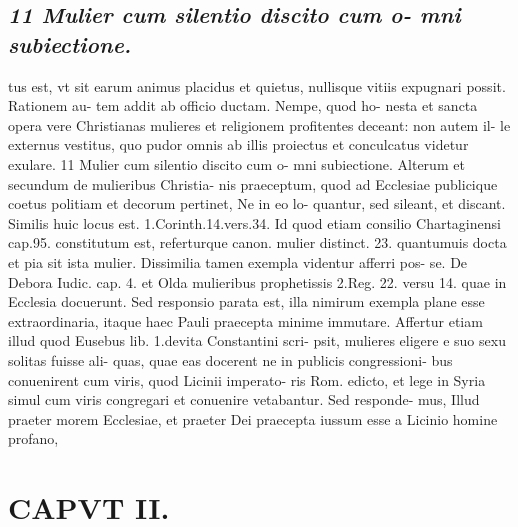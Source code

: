 \documentclass{article}
\begin{document}
\begin{pages}
\subsection*{\textit{11 Mulier cum silentio discito cum o- mni subiectione.}}tus est, vt sit earum animus placidus et quietus, nullisque vitiis expugnari possit. Rationem au- tem addit ab officio ductam. Nempe, quod ho- nesta et sancta opera vere Christianas mulieres et religionem profitentes deceant: non autem il- le externus vestitus, quo pudor omnis ab illis proiectus et conculcatus videtur exulare. 11 Mulier cum silentio discito cum o- mni subiectione. Alterum et secundum de mulieribus Christia- nis praeceptum, quod ad Ecclesiae publicique coetus politiam et decorum pertinet, Ne in eo lo- quantur, sed sileant, et discant. Similis huic locus est. 1.Corinth.14.vers.34. Id quod etiam consilio Chartaginensi cap.95. constitutum est, referturque canon. mulier distinct. 23. quantumuis docta et pia sit ista mulier. Dissimilia tamen exempla videntur afferri pos- se. De Debora Iudic. cap. 4. et Olda mulieribus prophetissis 2.Reg. 22. versu 14. quae in Ecclesia docuerunt. Sed responsio parata est, illa nimirum exempla plane esse extraordinaria, itaque haec Pauli praecepta minime immutare. Affertur etiam illud quod Eusebus lib.  1.devita Constantini scri- psit, mulieres eligere e suo sexu solitas fuisse ali- quas, quae eas docerent ne in publicis congressioni- bus conuenirent cum viris, quod Licinii imperato- ris Rom. edicto, et lege in Syria simul cum viris congregari et conuenire vetabantur. Sed responde- mus, Illud praeter morem Ecclesiae, et praeter Dei praecepta iussum esse a Licinio homine profano,  \pend
\section*{CAPVT  II. }
\marginpar{[ p.83 ]}\pstart {}
{}

\end{pages}
\end{document}

